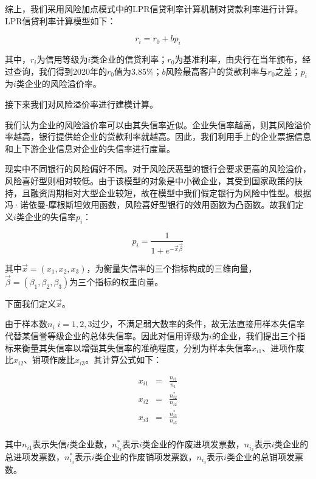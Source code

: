 \documentclass[withoutpreface,bwprint]{cumcmthesis} %
\begin{document}
综上，我们采用风险加点模式中的LPR信贷利率计算机制对贷款利率进行计算。LPR信贷利率计算模型如下：

\begin{equation}
r_i=r_0+bp_i
\end{equation}

其中，$r_i$为信用等级为$i$类企业的信贷利率；$r_0$为基准利率，由央行在当年颁布，经过查询，我们得到2020年的$r_0$值为$3.85\%$；$b$风险最高客户的贷款利率与$r_0$之差；$p_i$为$i$类企业的风险溢价率。

接下来我们对风险溢价率进行建模计算。

我们认为企业的风险溢价率可以由其失信率近似。企业失信率越高，则其风险溢价率越高，银行提供给企业的贷款利率就越高。因此，我们利用手上的企业票据信息和上下游企业信息对企业的失信率进行度量。

现实中不同银行的风险偏好不同。对于风险厌恶型的银行会要求更高的风险溢价，风险喜好型则相对较低。由于该模型的对象是中小微企业，其受到国家政策的扶持，且融资周期相对大型企业较短，故在模型中我们假定银行为风险中性型。根据冯·诺依曼-摩根斯坦效用函数，风险喜好型银行的效用函数为凸函数。故我们定义$i$类企业的失信率$p_i$：

\begin{equation}
p_i=\frac{1}{1+e^{-\overrightarrow{x}  \overrightarrow{\beta}}}
\end{equation}

其中$\vec x=(x_1,x_2,x_3)$，为衡量失信率的三个指标构成的三维向量，$\overrightarrow{\beta}=(\beta_1,\beta_2,\beta_3)$为三个指标的权重向量。 

下面我们定义$\vec x$。

由于样本数$n_i\;i=1,2,3$过少，不满足弱大数率的条件，故无法直接用样本失信率代替某信誉等级企业的总体失信率。因此对信用评级为$i$的企业，我们提出三个指标来衡量其失信率以增强其失信率的准确程度，分别为样本失信率$x_{i1}$、进项作废比$x_{i2}$、销项作废比$x_{i3}$。其计算公式如下：

\begin{equation}
\begin{array}{rcl}
x_{i1}&=&\frac{n_{i1}}{n_1}\\
x_{i2}&=&\frac{n_{i2}^*}{n_{i2}}\\
x_{i3}&=&\frac{n_{i3}^*}{n_{i3}}\\
\end{array}
\end{equation}

其中$n_{i1}$表示失信$i$类企业数，$n^*_{i_2}$表示$i$类企业的作废进项发票数，$n_{i_2}$表示$i$类企业的总进项发票数，$n^*_{i_3}$表示$i$类企业的作废销项发票数，$n_{i_3}$表示$i$类企业的总销项发票数。
\end{document}
